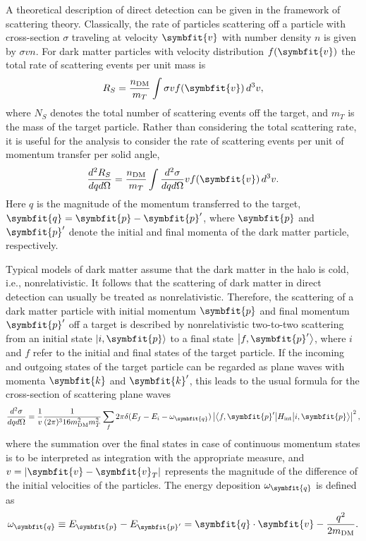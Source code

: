 \documentclass[b5paper, 10pt, twoside]{book}
\renewcommand{\vec}[1]{\symbfit{#1}}
\newcommand{\ddder}[3]{\frac{d^2#1}{d#2d#3}}
\newcommand{\difd}{\,d}
\newcommand{\ket}[1]{\left|#1\right\rangle}
\newcommand{\brakett}[3]{\left\langle#1\middle|#2\middle|#3\right\rangle}
\begin{document}
A theoretical description of direct detection can be given in the framework of scattering theory. Classically, the rate of particles scattering off a particle with cross-section $\sigma$ traveling at velocity $\vec{v}$ with number density $n$ is given by $\sigma vn$. For dark matter particles with velocity distribution $f(\vec{v})$ the total rate of scattering events per unit mass is
\begin{equation}
    R_S=\frac{n_\text{DM}}{m_T}\int\sigma vf(\vec{v})\difd^3v,
\end{equation}
where $N_S$ denotes the total number of scattering events off the target, and $m_T$ is the mass of the target particle. Rather than considering the total scattering rate, it is useful for the analysis to consider the rate of scattering events per unit of momentum transfer per solid angle,
\begin{equation}
    \ddder{R_S}{q}{\Omega}=\frac{n_\text{DM}}{m_T}\int\ddder{\sigma}{q}{\Omega}vf(\vec{v})\difd^3{v}.
\end{equation}
Here $q$ is the magnitude of the momentum transferred to the target, $\vec{q}=\vec{p}-\vec{p}'$, where $\vec{p}$ and $\vec{p}'$ denote the initial and final momenta of the dark matter particle, respectively.

Typical models of dark matter assume that the dark matter in the halo is cold, i.e., nonrelativistic. It follows that the scattering of dark matter in direct detection can usually be treated as nonrelativistic. Therefore, the scattering of a dark matter particle with initial momentum $\vec{p}$ and final momentum $\vec{p}'$ off a target is described by nonrelativistic two-to-two scattering from an initial state $\ket{i,\vec{p}}$ to a final state $\ket{f,\vec{p}'}$, where $i$ and $f$ refer to the initial and final states of the target particle. If the incoming and outgoing states of the target particle can be regarded as plane waves with momenta $\vec{k}$ and $\vec{k}'$, this leads to the usual formula for the cross-section of scattering plane waves
\begin{equation}
    \ddder{\sigma}{q}{\Omega}=\frac{1}{v}\frac{1}{(2\pi)^3 16m_\text{DM}^2m_T^2}\sum_f2\pi\delta(E_f-E_i-\omega_{\vec{q}})\left|\brakett{f,\vec{p}'}{H_\text{int}}{i,\vec{p}}\right|^2,
\end{equation}
where the summation over the final states in case of continuous momentum states is to be interpreted as integration with the appropriate measure, and $v=|\vec{v}-\vec{v}_T|$ represents the magnitude of the difference of the initial velocities of the particles. The energy deposition $\omega_{\vec{q}}$ is defined as
\begin{equation}
    \omega_{\vec{q}}\equiv E_{\vec{p}}-E_{\vec{p}'}=\vec{q}\cdot\vec{v}-\frac{q^2}{2m_\text{DM}}.
\end{equation}
\end{document}
